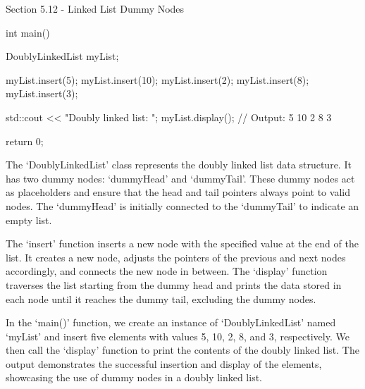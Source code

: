 \begin{notes}{Section 5.12 - Linked List Dummy Nodes}
\begin{highlight}
\begin{code}[C++]
    int main() {
        DoublyLinkedList myList;
    
        myList.insert(5);
        myList.insert(10);
        myList.insert(2);
        myList.insert(8);
        myList.insert(3);
    
        std::cout << "Doubly linked list: ";
        myList.display();  // Output: 5 10 2 8 3
    
        return 0;
    }        
    \end{code}
        The `DoublyLinkedList' class represents the doubly linked list data structure. It has two dummy nodes: `dummyHead' and `dummyTail'. These dummy nodes act as placeholders and ensure that the head and tail pointers always point to valid nodes. The `dummyHead' is initially connected to the `dummyTail' to indicate an empty list.
    
        The `insert' function inserts a new node with the specified value at the end of the list. It creates a new node, adjusts the pointers of the previous and next nodes accordingly, and connects the new node in between. The `display' function traverses the list starting from the dummy head and prints the data stored in each node until it reaches the dummy 
        tail, excluding the dummy nodes.
    
        In the `main()' function, we create an instance of `DoublyLinkedList' named `myList' and insert five elements with values 5, 10, 2, 8, and 3, respectively. We then call the `display' function to print the contents of the doubly linked list. The output demonstrates the successful insertion and display of the elements, showcasing the use of dummy nodes 
        in a doubly linked list.
    \end{highlight}
\end{notes}

